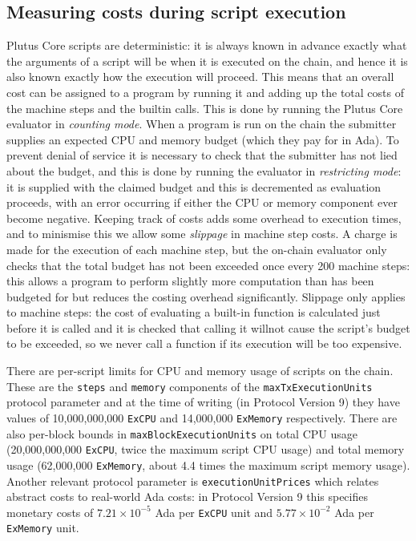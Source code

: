 \documentclass[a4paper]{article}
\begin{document}
\subsection{Measuring costs during script execution}  Plutus Core scripts
are deterministic: it is always known in advance exactly what the arguments of a
script will be when it is executed on the chain, and hence it is also known
exactly how the execution will proceed.  This means that an overall cost can be
assigned to a program by running it and adding up the total costs of the machine
steps and the builtin calls.  This is done by running the Plutus Core evaluator
in \textit{counting mode}.  When a program is run on the chain the submitter
supplies an expected CPU and memory budget (which they pay for in Ada).  To
prevent denial of service it is necessary to check that the submitter has not
lied about the budget, and this is done by running the evaluator in
\textit{restricting mode}: it is supplied with the claimed budget and this is
decremented as evaluation proceeds, with an error occurring if either the CPU or
memory component ever become negative.  Keeping track of costs adds some
overhead to execution times, and to minismise this we allow some
\textit{slippage} in machine step costs.  A charge is made for the execution of
each machine step, but the on-chain evaluator only checks that the total budget
has not been exceeded once every 200 machine steps: this allows a program to
perform slightly more computation than has been budgeted for but reduces the
costing overhead significantly.  Slippage only applies to machine steps: the
cost of evaluating a built-in function is calculated just before it is called
and it is checked that calling it willnot cause the script's budget to be
exceeded, so we never call a function if its execution will be too expensive.


There are per-script limits for CPU and memory usage of scripts on the chain.
These are the \texttt{steps} and \texttt{memory} components of the
\texttt{maxTxExecution\-Units} protocol parameter and at the time of writing
(in Protocol Version 9) they have values of 10,000,000,000 \texttt{ExCPU} and
14,000,000 \texttt{ExMemory} respectively.  There are also per-block bounds in
\texttt{maxBlock\-Exe\-cutionUnits} on total CPU usage (20,000,000,000
\texttt{ExCPU}, twice the maximum script CPU usage) and total memory usage
(62,000,000 \texttt{ExMemory}, about 4.4 times the maximum script memory usage).
Another relevant protocol parameter is \texttt{executionUnitPrices} which
relates abstract costs to real-world Ada costs: in Protocol Version 9 this
specifies monetary costs of $7.21\times10^{-5}$ Ada per \texttt{ExCPU} unit and
$5.77\times10^{-2}$ Ada per \texttt{ExMemory} unit.
\end{document}
